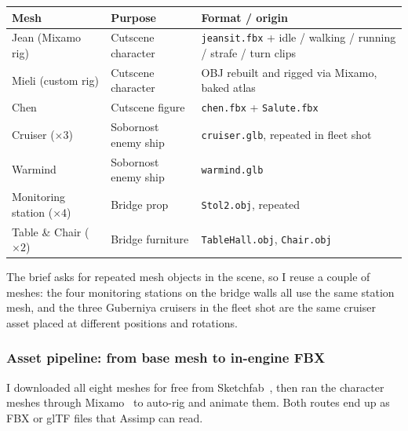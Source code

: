 \documentclass[11pt,a4paper]{article}
\begin{document}
\begin{center}
\small
\begin{tabular}{lll}
\toprule
\textbf{Mesh} & \textbf{Purpose} & \textbf{Format / origin}~\footnotemark[1] \\
\midrule
Jean (Mixamo rig)        & Cutscene character      & \texttt{jeansit.fbx} + idle / walking / running / strafe / turn clips \\
Mieli (custom rig)       & Cutscene character      & OBJ rebuilt and rigged via Mixamo, baked atlas \\
Chen                     & Cutscene figure         & \texttt{chen.fbx} + \texttt{Salute.fbx} \\
Cruiser ($\times 3$)     & Sobornost enemy ship    & \texttt{cruiser.glb}, repeated in fleet shot \\
Warmind                  & Sobornost enemy ship    & \texttt{warmind.glb} \\
Monitoring station ($\times 4$) & Bridge prop      & \texttt{Stol2.obj}, repeated \\
Table \& Chair ($\times 2$) & Bridge furniture     & \texttt{TableHall.obj}, \texttt{Chair.obj} \\
\bottomrule
\end{tabular}
\end{center}

The brief asks for repeated mesh objects in the scene, so I reuse a couple
of meshes: the four monitoring stations on the bridge walls all use the
same station mesh, and the three Guberniya cruisers in the fleet shot are
the same cruiser asset placed at different positions and rotations.


\subsubsection*{Asset pipeline: from base mesh to in-engine FBX}

I downloaded all eight meshes for free from Sketchfab~\cite{sketchfab}, then
ran the character meshes through Mixamo~\cite{mixamo} to auto-rig and
animate them. Both routes end up as FBX or glTF files that Assimp can read.
\end{document}
